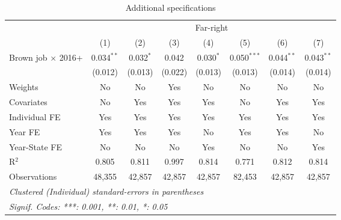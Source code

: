 \begin{table}[htbp]
   \caption{Additional specifications}
   \centering
   \begin{tabular}{lccccccc}
      \tabularnewline \midrule \midrule
       & \multicolumn{7}{c}{Far-right}\\
                                & (1)          & (2)         & (3)     & (4)         & (5)           & (6)          & (7)\\  
      Brown job $\times$ 2016+  & 0.034$^{**}$ & 0.032$^{*}$ & 0.042   & 0.030$^{*}$ & 0.050$^{***}$ & 0.044$^{**}$ & 0.043$^{**}$\\   
                                & (0.012)      & (0.013)     & (0.022) & (0.013)     & (0.013)       & (0.014)      & (0.014)\\   
      Weights                   & No           & No          & Yes     & No          & No            & No           & No\\  
      Covariates                & No           & Yes         & Yes     & Yes         & No            & Yes          & Yes\\  
      Individual FE             & Yes          & Yes         & Yes     & Yes         & Yes           & Yes          & Yes\\  
      Year FE                   & Yes          & Yes         & Yes     & No          & Yes           & Yes          & No\\  
      Year-State FE             & No           & No          & No      & Yes         & No            & No           & Yes\\  
      R$^2$                     & 0.805        & 0.811       & 0.997   & 0.814       & 0.771         & 0.812        & 0.814\\  
      Observations              & 48,355       & 42,857      & 42,857  & 42,857      & 82,453        & 42,857       & 42,857\\  
      \midrule \midrule
      \multicolumn{8}{l}{\emph{Clustered (Individual) standard-errors in parentheses}}\\
      \multicolumn{8}{l}{\emph{Signif. Codes: ***: 0.001, **: 0.01, *: 0.05}}\\
   \end{tabular}
\end{table}



